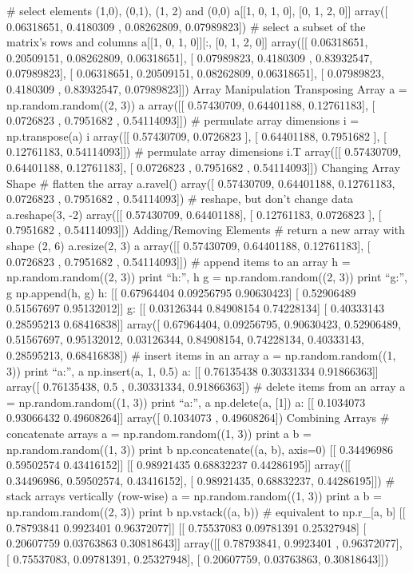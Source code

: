 # select elements (1,0), (0,1), (1, 2) and (0,0)
a[[1, 0, 1, 0], [0, 1, 2, 0]]
array([ 0.06318651, 0.4180309 , 0.08262809, 0.07989823])
# select a subset of the matrix’s rows and columns
a[[1, 0, 1, 0]][:, [0, 1, 2, 0]]
array([[ 0.06318651, 0.20509151, 0.08262809, 0.06318651], [ 0.07989823, 0.4180309 , 0.83932547, 0.07989823], [ 0.06318651, 0.20509151, 0.08262809, 0.06318651], [ 0.07989823, 0.4180309 , 0.83932547, 0.07989823]])
Array Manipulation
Transposing Array
a = np.random.random((2, 3))
a
array([[ 0.57430709, 0.64401188, 0.12761183], [ 0.0726823 , 0.7951682 , 0.54114093]])
# permulate array dimensions
i = np.transpose(a)
i
array([[ 0.57430709, 0.0726823 ], [ 0.64401188, 0.7951682 ], [ 0.12761183, 0.54114093]])
# permulate array dimensions
i.T
array([[ 0.57430709, 0.64401188, 0.12761183], [ 0.0726823 , 0.7951682 , 0.54114093]])
Changing Array Shape
# flatten the array
a.ravel()
array([ 0.57430709, 0.64401188, 0.12761183, 0.0726823 , 0.7951682 , 0.54114093])
# reshape, but don’t change data
a.reshape(3, -2)
array([[ 0.57430709, 0.64401188], [ 0.12761183, 0.0726823 ], [ 0.7951682 , 0.54114093]])
Adding/Removing Elements
# return a new array with shape (2, 6)
a.resize(2, 3)
a
array([[ 0.57430709, 0.64401188, 0.12761183], [ 0.0726823 , 0.7951682 , 0.54114093]])
# append items to an array
h = np.random.random((2, 3))
print “h:”, h
g = np.random.random((2, 3))
print “g:”, g
np.append(h, g)
h: [[ 0.67964404 0.09256795 0.90630423] [ 0.52906489 0.51567697 0.95132012]] g: [[ 0.03126344 0.84908154 0.74228134] [ 0.40333143 0.28595213 0.68416838]] array([ 0.67964404, 0.09256795, 0.90630423, 0.52906489, 0.51567697, 0.95132012, 0.03126344, 0.84908154, 0.74228134, 0.40333143, 0.28595213, 0.68416838])
# insert items in an array
a = np.random.random((1, 3))
print “a:”, a
np.insert(a, 1, 0.5)
a: [[ 0.76135438 0.30331334 0.91866363]] array([ 0.76135438, 0.5 , 0.30331334, 0.91866363])
# delete items from an array
a = np.random.random((1, 3))
print “a:”, a
np.delete(a, [1])
a: [[ 0.1034073 0.93066432 0.49608264]] array([ 0.1034073 , 0.49608264])
Combining Arrays
# concatenate arrays
a = np.random.random((1, 3))
print a
b = np.random.random((1, 3))
print b
np.concatenate((a, b), axis=0)
[[ 0.34496986 0.59502574 0.43416152]] [[ 0.98921435 0.68832237 0.44286195]] array([[ 0.34496986, 0.59502574, 0.43416152], [ 0.98921435, 0.68832237, 0.44286195]])
# stack arrays vertically (row-wise)
a = np.random.random((1, 3))
print a
b = np.random.random((2, 3))
print b
np.vstack((a, b)) #  equivalent to np.r_[a, b]
[[ 0.78793841 0.9923401 0.96372077]] [[ 0.75537083 0.09781391 0.25327948] [ 0.20607759 0.03763863 0.30818643]] array([[ 0.78793841, 0.9923401 , 0.96372077], [ 0.75537083, 0.09781391, 0.25327948], [ 0.20607759, 0.03763863, 0.30818643]])
